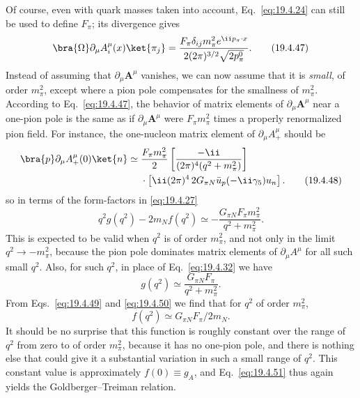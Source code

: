 Of course, even with quark masses taken into account, Eq.~\eqref{eq:19.4.24} can still be used to define $F_\pi$; its divergence gives
\begin{equation}
\bra{\Omega}\partial_\mu A_i^\mu(x)\ket{\pi_j}
=\frac{F_\pi\delta_{ij}m_\pi^2e^{\ii p_\pi\cdot x}}
{2(2\pi)^{3/2}\sqrt{2p_\pi^0}}.
\tag{19.4.47}\label{eq:19.4.47}
\end{equation}
Instead of assuming that $\partial_\mu\mathbf{A}^\mu$ vanishes, we can now assume that it is \emph{small}, of order $m_\pi^2$, except where a pion pole compensates for the smallness of $m_\pi^2$. According to Eq.~\eqref{eq:19.4.47}, the behavior of matrix elements of $\partial_\mu\mathbf{A}^\mu$ near a one-pion pole is the same as if $\partial_\mu\mathbf{A}^\mu$ were $F_\pi m_\pi^2$ times a properly renormalized pion field. For instance, the one-nucleon matrix element of $\partial_\mu A_+^\mu$ should be
\begin{align}
\bra{p}\partial_\mu A_+^\mu(0)\ket{n}
\simeq{}&
\frac{F_\pi m_\pi^2}{2}
\left[\frac{-\ii}{(2\pi)^4(q^2+m_\pi^2)}\right]
\notag\\
&\cdot
\left[\ii(2\pi)^4\,2G_{\pi N}
\bar u_p(-\ii\gamma_5)u_n\right].
\tag{19.4.48}\label{eq:19.4.48}
\end{align}
so in terms of the form-factors in \eqref{eq:19.4.27}
\begin{equation}
q^2g(q^2)-2m_Nf(q^2)
\simeq-\frac{G_{\pi N}F_\pi m_\pi^2}
{q^2+m_\pi^2}.
\tag{19.4.49}\label{eq:19.4.49}
\end{equation}
This is expected to be valid when $q^2$ is of order $m_\pi^2$, and not only in the limit $q^2\to-m_\pi^2$, because the pion pole dominates matrix elements of $\partial_\mu A^\mu$ for all such small $q^2$. Also, for such $q^2$, in place of Eq.~\eqref{eq:19.4.32} we have
\begin{equation}
g(q^2)\simeq\frac{G_{\pi N}F_\pi}{q^2+m_\pi^2}.
\tag{19.4.50}\label{eq:19.4.50}
\end{equation}
From Eqs.~\eqref{eq:19.4.49} and \eqref{eq:19.4.50} we find that for $q^2$ of order $m_\pi^2$,
\begin{equation}
f(q^2)\simeq G_{\pi N}F_\pi/2m_N.
\tag{19.4.51}\label{eq:19.4.51}
\end{equation}
It should be no surprise that this function is roughly constant over the range of $q^2$ from zero to of order $m_\pi^2$, because it has no one-pion pole, and there is nothing else that could give it a substantial variation in such a small range of $q^2$. This constant value is approximately $f(0)\equiv g_A$, and Eq.~\eqref{eq:19.4.51} thus again yields the Goldberger--Treiman relation.

